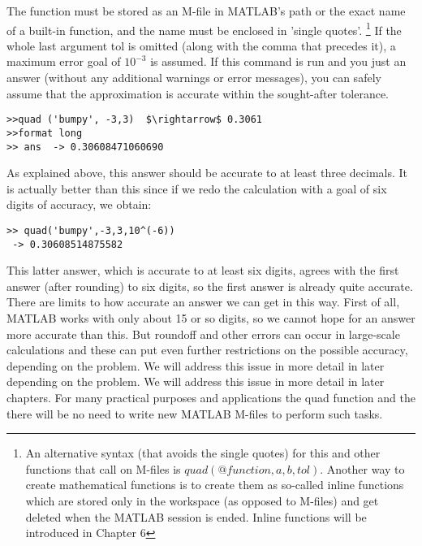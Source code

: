 \documentclass[../main.tex]{subfiles}
\begin{document}
The function must be stored as an M-file in MATLAB's path or the exact name of a built-in function, and the name must be enclosed in 'single quotes'. \footnote{An alternative syntax (that avoids the single quotes) for this and other functions that call on M-files is $quad (@function, a, b, tol)$. Another way to create mathematical functions is to create them as so-called inline functions which are stored only in the workspace (as opposed to M-files) and get deleted when the MATLAB session is ended. Inline functions will be introduced in Chapter 6} If the whole last argument tol is omitted (along with the comma that precedes it), a maximum error goal of $10^{-3}$ is assumed. If this command is run and you just  an answer (without any additional warnings or error messages), you can safely assume that the approximation is accurate within the sought-after tolerance. 

\begin{verbatim}
>>quad ('bumpy', -3,3)  $\rightarrow$ 0.3061 
>>format long 
>> ans  -> 0.30608471060690
\end{verbatim}

As explained above, this answer should be accurate to at least three decimals. It is actually better than this since if we redo the calculation with a goal of six digits of accuracy, we obtain:


\begin{verbatim}
>> quad('bumpy',-3,3,10^(-6))
 -> 0.30608514875582
\end{verbatim}

This latter answer, which is accurate to at least six digits, agrees with the first answer (after rounding) to six digits, so the first answer is already quite accurate. There are limits to how accurate an answer we can get in this way. First of all, MATLAB works with only about 15 or so digits, so we cannot hope for an answer more accurate than this. But roundoff and other errors can occur in large-scale calculations and these can put even further restrictions on the possible accuracy, depending on the problem. We will address this issue in more detail in later depending on the problem. We will address this issue in more detail in later chapters. For many practical purposes and applications the quad function and the there will be no need to write new MATLAB M-files to perform such tasks.\\
\end{document}
